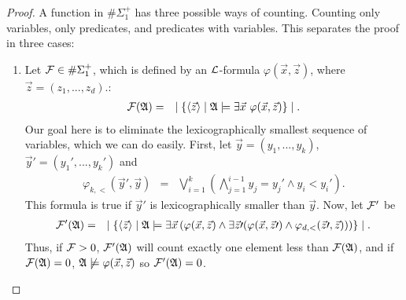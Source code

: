 \documentclass[12pt]{article}
\def\A{{\frak A}}
\def\L{{\cal L}}
\def\F{{\cal F}}
\def\x{\vec{x}}
\def\y{\vec{y}}
\def\z{\vec{z}}
\begin{document}
\begin{proof}
A function in $\#\Sigma_1^+$ has three possible ways of counting. Counting only variables, only predicates, and predicates with variables. This separates the proof in three cases:
\begin{enumerate}


\item Let $\F \in \#\Sigma_1^+$, which is defined by an $\L$-formula $\varphi(\x,\z)$, where $\z = (z_1,...,z_d)$.:
\begin{eqnarray*}
\F(\A) &=& \mid \{ \langle\z\rangle \mid \A \models \exists \x \ \varphi(\x,\z) \} \mid.
\end{eqnarray*}
Our goal here is to eliminate the lexicographically smallest sequence of variables, which we can do easily. First, let $\y = (y_1,...,y_k)$, $\y\prime = (y_1\prime,...,y_k\prime)$ and
\begin{eqnarray*}
\varphi_{k,<}(\y\prime,\y) &=& \bigvee_{i = 1}^k \left( \bigwedge_{j=1}^{i-1} y_j = y_j\prime \wedge y_i < y_i\prime \right).
\end{eqnarray*}
This formula is true if $\y\prime$ is lexicographically smaller than $\y$. Now, let $\F'$ be
\begin{eqnarray*}
\F'(\A) &=& \mid \{ \langle\z\rangle \mid \A \models \exists \x\left( \varphi(\x,\z) \wedge \exists \z\prime (\varphi(\x,\z\prime) \wedge \varphi_{d,<}(\z\prime,\z ) ) \right) \} \mid.
\end{eqnarray*}
Thus, if $\F>0$, $\F'(\A)$ will count exactly one element less than $\F(\A)$, and if $\F(\A)=0$, $\A \not\models\varphi(\x,\z)$ so $\F'(\A)=0$.



\end{enumerate}
\end{proof}
\end{document}
